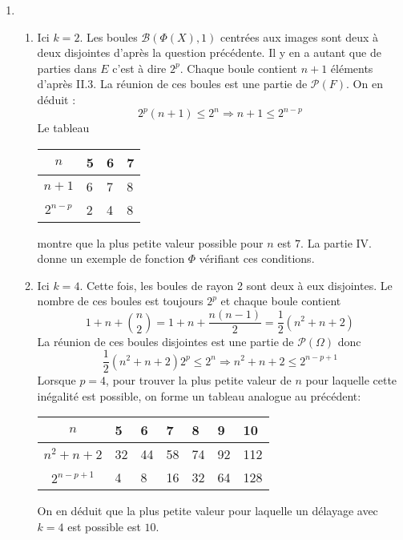 \begin{enumerate}
  \item \begin{enumerate}
\item Ici $k=2$. Les boules $\mathcal B(\Phi(X),1)$ centrées aux images sont deux à deux disjointes d'après la question précédente. Il y en a autant que de parties dans $E$ c'est à dire $2^p$. Chaque boule contient $n+1$ éléments d'après II.3. La réunion de ces boules est une partie de $\mathcal P(F)$. On en déduit :
\begin{displaymath}
 2^p(n+1)\leq 2^n \Rightarrow n+1 \leq 2^{n-p}
\end{displaymath}
Le tableau
\begin{center}
\renewcommand{\arraystretch}{1.3}
\begin{tabular}{c|l|l|l}
$n$ & 5 & 6 & 7 \\ \hline
$n+1$ & 6 & 7 & 8 \\ \hline
$2^{n-p}$ & 2 & 4 & 8
\end{tabular}
\end{center}
montre que la plus petite valeur possible pour $n$ est $7$. La partie IV. donne un exemple de fonction $\Phi$ vérifiant ces conditions.
\item Ici $k=4$. Cette fois, les boules de rayon 2 sont deux à eux disjointes. Le nombre de ces boules est toujours $2^{p}$ et chaque boule contient
\begin{displaymath}
 1+n+\binom{n}{2}=1+n+\frac{n(n-1)}{2}=\frac{1}{2}(n^2+n+2)
\end{displaymath}
La réunion de ces boules disjointes est une partie de $\mathcal P(\Omega)$ donc
\begin{displaymath}
 \frac{1}{2}(n^2+n+2)2^{p}\leq 2^{n} \Rightarrow n^2+n+2 \leq 2^{n-p+1}
\end{displaymath}
Lorsque $p=4$, pour trouver la plus petite valeur de $n$ pour laquelle cette inégalité est possible, on forme un tableau analogue au précédent:
\begin{center}
\renewcommand{\arraystretch}{1.3}
\begin{tabular}{c|l|l|l|l|l|l}
$n$ & 5 & 6 & 7 & 8 & 9 & 10 \\ \hline
$n^2+n+2$ & 32 & 44 & 58 & 74 & 92 & 112 \\ \hline
$2^{n-p+1}$ & 4 & 8 & 16 & 32 & 64 & 128
\end{tabular}
\end{center}
On en déduit que la plus petite valeur pour laquelle un délayage avec $k=4$ est possible est $10$.
\end{enumerate}
\end{enumerate}
